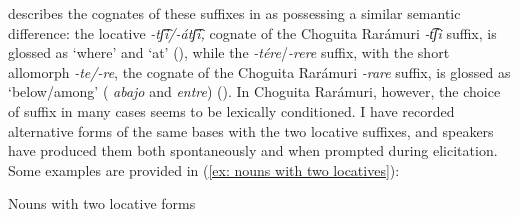     \z
\z

\citet{miller1996guarijio} describes the cognates of these suffixes in  as possessing a similar semantic difference: the  locative \textit{-tʃ͡i/-átʃ͡i,} cognate of the Choguita Rarámuri \textit{-t͡ʃi} suffix, is glossed as ‘where’ and ‘at’ (\citeyear[192--193]{miller1996guarijio}), while the  \textit{-tére}/\textit{-rere} suffix, with the short allomorph \textit{-te/-re}, the cognate of the Choguita Rarámuri \textit{-rare} suffix, is glossed as ‘below/among’ ( \textit{abajo} and \textit{entre}) (\citeyear[287]{miller1996guarijio}). In Choguita Rarámuri, however, the choice of suffix in many cases seems to be lexically conditioned. I have recorded alternative forms of the same bases with the two locative suffixes, and speakers have produced them both spontaneously and when prompted during elicitation. Some examples are provided in (\ref{ex: nouns with two locatives}):


\ea\label{ex: nouns with two locatives}
{Nouns with two locative forms}

